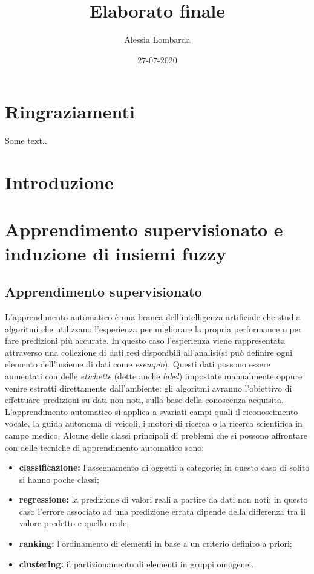 \documentclass[oneside, openany]{book}
\title{Elaborato finale}
\date{27-07-2020}
\author{Alessia Lombarda}
\begin{document}
	\begin{titlepage}
		
	\end{titlepage}
	\frontmatter
	\chapter*{Ringraziamenti}
	Some text...
	\tableofcontents
	\mainmatter
	\chapter*{Introduzione}
		{} 
	\chapter[Apprendimento supervisionato]{Apprendimento supervisionato e induzione di insiemi fuzzy}
		\section{Apprendimento supervisionato}
		L'apprendimento automatico è una branca dell'intelligenza artificiale che studia algoritmi che utilizzano l'esperienza per migliorare la propria performance o per fare predizioni più accurate. In questo caso l'esperienza viene rappresentata attraverso una collezione di dati resi disponibili all'analisi(si può definire ogni elemento dell'insieme di dati come \textit{esempio}). Questi dati possono essere aumentati con delle \textit{etichette} (dette anche \textit{label}) impostate manualmente oppure venire estratti direttamente dall'ambiente: gli algoritmi avranno l'obiettivo di effettuare predizioni su dati non noti, sulla base della conoscenza acquisita.
		L'apprendimento automatico si applica a svariati campi quali il riconoscimento vocale, la guida autonoma di veicoli, i motori di ricerca o la ricerca scientifica in campo medico. Alcune delle classi principali di problemi che si possono affrontare con delle tecniche di apprendimento automatico sono:
		\begin{itemize}
			\item\textbf{classificazione:} l'assegnamento di oggetti a categorie; in questo caso di solito si hanno poche classi;
			\item\textbf{regressione:} la predizione di valori reali a partire da dati non noti; in questo caso l'errore associato ad una predizione errata dipende della differenza tra il valore predetto e quello reale;
			\item\textbf{ranking:} l'ordinamento di elementi in base a un criterio definito a priori;
			\item\textbf{clustering:} il partizionamento di elementi in gruppi omogenei.
		\end{itemize}
	
\end{document}
